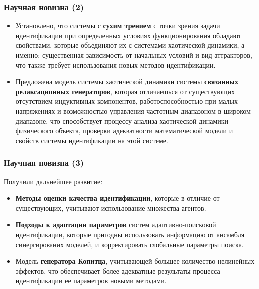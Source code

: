 \documentclass[10pt,utf8]{beamer}
\begin{document}
\begin{frame}
  \frametitle{Научная новизна (2)}

  \begin{itemize}

    \item
      Установлено, что системы с \textbf{сухим трением} с точки зрения задачи идентификации при
      определенных условиях функционирования обладают свойствами, которые объединяют их с
      системами хаотической динамики, а именно:
      существенная зависимость от начальных условий и вид аттракторов, что
      также требует использования новых методов идентификации.

    \item
      Предложена модель системы хаотической динамики системы
      \textbf{связанных релаксационных генераторов},
      которая отличаешься от существующих отсутствием индуктивных
      компонентов, работоспособностью при малых напряжениях и возможностью управления
      частотным диапазоном в широком диапазоне, что способствует процессу анализа
      хаотической динамики физического объекта, проверки адекватности математической
      модели и свойств системы идентификации на этой системе.

  \end{itemize}

\end{frame}




\begin{frame}
  \frametitle{Научная новизна (3)}

\noindent
Получили дальнейшее развитие:

  \begin{itemize}

    \item
      \textbf{Методы оценки качества идентификации},
      которые в отличие от существующих,
      учитывают использование множества агентов.

    \item
      \textbf{Подходы к адаптации параметров}
      систем адаптивно-поисковой идентификации,
      которые пригодны использовать информацию от ансамбля синергированих моделей, и
      корректировать глобальные параметры поиска.

    \item
      Модель \textbf{генератора Копитца}, учитывающей большее количество нелинейных эффектов,
      что обеспечивает более адекватные результаты процесса идентификации ее
      параметров новыми методами.

  \end{itemize}


\end{frame}
\end{document}

